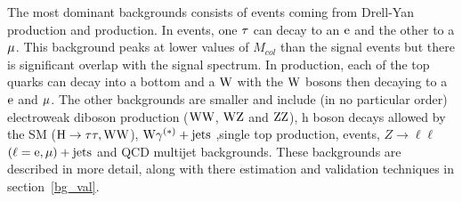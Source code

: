The most dominant backgrounds consists of \ztt events coming from Drell-Yan production and \ttb production. In \ztt events, one $\tau$ can decay to an $\text{e}$ and the other to a $\mu$. This background peaks at lower values of $M_{col}$ than the signal events but there is significant overlap with the signal spectrum. In \ttb production, each of the top quarks can decay into a bottom and a $\text{W}$ with the $\text{W}$ bosons then decaying to a $\text{e}$ and $\mu$. The other backgrounds are smaller and include (in no particular order) electroweak diboson production ($\text{W}\text{W}$, $\text{W}\text{Z}$ and $\text{Z}\text{Z}$), h boson decays allowed by the SM ($\text{H} \to \tau\tau,\text{W}\text{W}$), $\text{W}\gamma^{(*)}+\text{jets}$ ,single top production, \wjets events, $Z\to\ell\ell$ $(\ell = \text{e}, \mu)+\text{jets}$ and QCD multijet backgrounds. These backgrounds are described in more detail, along with there estimation and validation techniques in section~\ref{bg_val}.        


